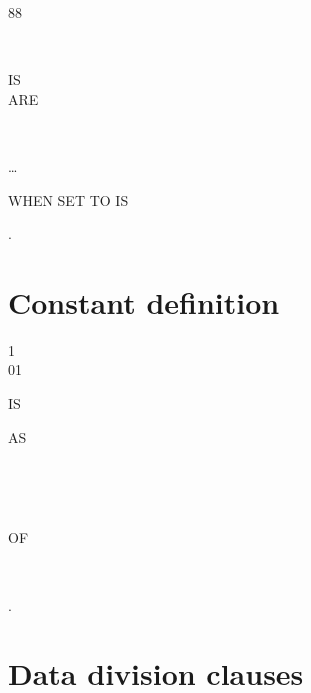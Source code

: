 88 \identifier
\begin{1=}
   \\
\end{1=}
\begin{0-1}
  IS \\
  ARE
\end{0-1}
\begin{1=}
  \literal
  \begin{0-1}
    \begin{1=}
       \\
    \end{1=}
    \literal
  \end{0-1}
\end{1=} \ldots

\begin{0-1}
  WHEN SET TO  IS \literal
\end{0-1}.

\section{Constant definition}

\begin{1=}
  1 \\
  01
\end{1=}
 \identifier {}
\begin{0-1}
  IS 
\end{0-1}
\begin{1=}
  AS
  \begin{1=}
    \literal \\
    \begin{1=}
       \\
    \end{1=}
    OF \identifier
  \end{1=} \\
\end{1=}.


\section{Data division clauses}

